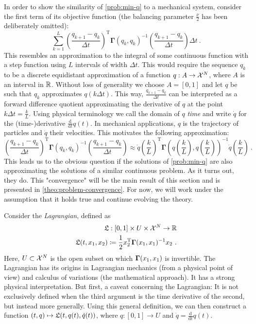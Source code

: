 In order to show the similarity of \cref{prob:min-q} to a mechanical system, consider the first term of its objective function (the balancing parameter $\frac{\nu}{2}$ has been deliberately omitted):
\begin{equation}
	\label{eq:discrete-lagrangian}
	\sum_{k=1}^{L} \left(\frac{q_{k+1} - q_k}{\Delta t}\right)^\mathrm{T} \mathbf{\Gamma}(q_k, q_k)^{-1} \left(\frac{q_{k+1} - q_k}{\Delta t}\right) \Delta t \ .
\end{equation}
This resembles an approximation to the integral of some continuous function with a step function using $L$ intervals of width $\Delta t$.
This would require the sequence $q_k$ to be a discrete equidistant approximation of a function $q: A \rightarrow \mathcal{X}^N$, where $A$ is an interval in $\mathbb{R}$.
Without loss of generality we choose $A = [0, 1]$ and let $q$ be such that $q_k$ approximates $q(k \Delta t)$.
This way, $\frac{q_{k+1} - q_k}{\Delta t}$ can be interpreted as a forward difference quotient approximating the derivative of $q$ at the point $k \Delta t = \frac{k}{L}$.
Using physical terminology we call the domain of $q$ \emph{time} and write $\dot{q}$ for the (time-)derivative $\frac{\mathrm{d}}{\mathrm{d}t}q(t)$.
In mechanical applications, $q$ is the trajectory of particles and $\dot{q}$ their velocities.
This motivates the following approximation:
\begin{equation}
	\left(\frac{q_{k+1} - q_k}{\Delta t}\right)^\mathrm{T} \mathbf{\Gamma}(q_k, q_k)^{-1} \left(\frac{q_{k+1} - q_k}{\Delta t}\right)
	\approx \dot{q}\left(\frac{k}{L}\right)^\mathrm{T} \mathbf{\Gamma}\left(q\left(\frac{k}{L}\right), q\left(\frac{k}{L}\right)\right)^{-1}\dot{q}\left(\frac{k}{L}\right) \ .
\end{equation}
This leads us to the obvious question if the solutions of \cref{prob:min-q} are also approximating the solutions of a similar continuous problem.
As it turns out, they do.
This "convergence" will be the main result of this section and is presented in \cref{theo:problem-convergence}.
For now, we will work under the assumption that it holds true and continue evolving the theory.

Consider the \emph{Lagrangian}, defined as
\begin{equation}
\label{eq:lagrangian}
\begin{split}
\mathfrak{L}: [0, 1] \times U \times \mathcal{X}^N \rightarrow \mathbb{R}\\ 
\mathfrak{L}(t, x_1, x_2) \coloneqq \frac{1}{2}  x_2^\mathrm{T} \mathbf{\Gamma}(x_1, x_1)^{-1} x_2 \ .
\end{split}
\end{equation}
Here, $U \subset \mathcal{X}^N$ is the open subset on which $\mathbf{\Gamma}(x_1, x_1)$ is invertible.
The Lagrangian has its origins in Lagrangian mechanics (from a physical point of view) and calculus of variations (the mathematical approach).
It has a strong physical interpretation.
But first, a caveat concerning the Lagrangian:
It is not exclusively defined when the third argument is the time derivative of the second, but instead more generally.
Using this general definition, we can then construct a function $(t, q) \mapsto \mathfrak{L}(t, q(t), \dot{q}(t))$, where $q: [0, 1] \rightarrow U$ and $\dot{q} = \frac{\mathrm{d}}{\mathrm{d}t}q(t)$.

